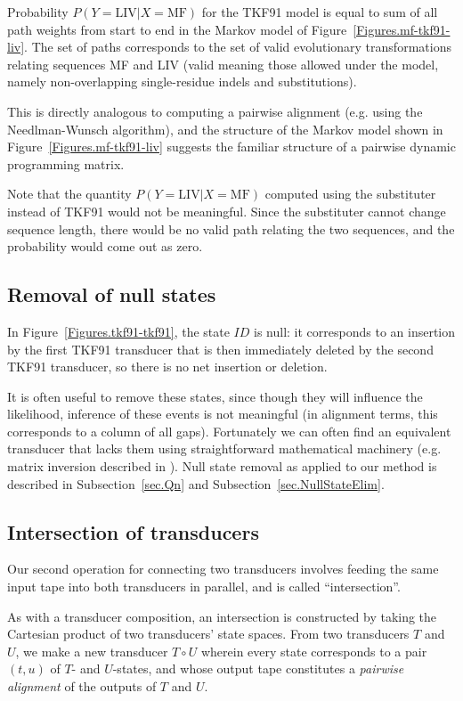 \documentclass{article}
\newcommand{\secref}[1]{Subsection~\ref{sec.#1}}
\newcommand{\seclabel}[1]{\label{sec.#1}}
\newcommand{\figref}[1]{Figure~\ref{Figures.#1}}
\newcommand\fork{\circ}
\begin{document}
Probability $P(Y=\mbox{LIV}|X=\mbox{MF})$ for the TKF91 model
is equal to sum of all path weights from start to end in the Markov model of \figref{mf-tkf91-liv}. 
The set of paths corresponds to the set of valid evolutionary transformations relating
sequences MF and LIV (valid meaning those allowed under the model, namely non-overlapping single-residue indels and substitutions).  

This is directly analogous to computing a pairwise alignment (e.g. using the Needlman-Wunsch algorithm), and the structure of the Markov model shown in \figref{mf-tkf91-liv} suggests the familiar structure of a pairwise dynamic programming matrix.  

Note that the quantity  $P(Y=\mbox{LIV}|X=\mbox{MF})$ computed 
using the  substituter instead of TKF91 would not be meaningful.  
Since the substituter cannot change sequence length, there would be no
valid path relating the two sequences, and the probability would come out as zero.  

\subsection{Removal of null states}

In \figref{tkf91-tkf91}, the state $ID$ is null:
it corresponds to an insertion by the first TKF91 transducer
that is then immediately deleted by the second TKF91 transducer,
so there is no net insertion or deletion.

It is often useful to remove these states, since though they will influence
the likelihood, inference of these events is not meaningful (in alignment terms,
this corresponds to a column of all gaps).  
Fortunately we can often find an equivalent transducer that lacks them
using straightforward mathematical machinery (e.g. matrix inversion described in \cite{BradleyHolmes2009}).  
Null state removal as applied to our method is described in
 \secref{Qn} and \secref{NullStateElim}.  


\subsection{Intersection of transducers}
\seclabel{Tutorial.Intersection}

Our second operation for connecting two transducers
involves feeding the same input tape into both transducers in parallel,
and is called ``intersection''.

As with a transducer composition,
an intersection is constructed by taking the Cartesian product of two transducers' state spaces.
From two transducers $T$ and $U$,
we make a new transducer $T \fork U$
wherein every state corresponds to a pair $(t,u)$ of $T$- and $U$-states,
and whose output tape constitutes a {\em pairwise alignment} of the outputs of $T$ and $U$.
\end{document}
